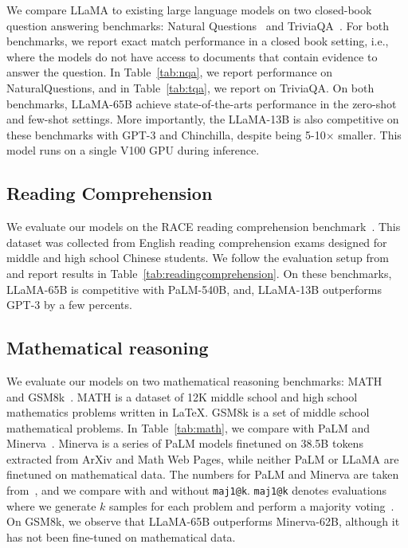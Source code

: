 We compare LLaMA to existing large language models on two closed-book question answering benchmarks: Natural Questions~\citep{kwiatkowski2019natural} and TriviaQA~\cite{joshi2017triviaqa}. For both benchmarks, we report exact match performance in a closed book setting, i.e., where the models do not have access to documents that contain evidence to answer the question. In Table~\ref{tab:nqa}, we report performance on NaturalQuestions, and in Table~\ref{tab:tqa}, we report on TriviaQA. On both benchmarks, LLaMA-65B achieve state-of-the-arts performance in the zero-shot and few-shot settings. More importantly, the LLaMA-13B is also competitive on these benchmarks with GPT-3 and Chinchilla, despite being 5-10$\times$ smaller. This model runs on a single V100 GPU during inference.

\subsection{Reading Comprehension} We evaluate our models on the RACE reading comprehension benchmark~\citep{lai2017race}. This dataset was collected from English reading comprehension exams designed for middle and high school Chinese students. We follow the evaluation setup from~\citet{brown2020gpt3}
and report results in Table~\ref{tab:readingcomprehension}.
On these benchmarks, LLaMA-65B is competitive with PaLM-540B, and, LLaMA-13B outperforms GPT-3 by a few percents.

\subsection{Mathematical reasoning}

We evaluate our models on two mathematical reasoning benchmarks: MATH~\cite{hendrycks2021measuring} and GSM8k~\cite{cobbe2021training}. MATH is a dataset of 12K middle school and high school mathematics problems written in LaTeX. GSM8k is a set of middle school mathematical problems. In Table~\ref{tab:math}, we compare with PaLM and Minerva~\cite{lewkowycz2022solving}. Minerva is a series of PaLM models finetuned on 38.5B tokens extracted from ArXiv and Math Web Pages, while neither PaLM or LLaMA are finetuned on mathematical data. The numbers for PaLM and Minerva are taken from~\citet{lewkowycz2022solving}, and we compare with and without \texttt{maj1@k}.
\texttt{maj1@k} denotes evaluations where we generate $k$ samples for each problem and perform a majority voting~\cite{wang2022Self}. On GSM8k, we observe that LLaMA-65B outperforms Minerva-62B, although it has not been fine-tuned on mathematical data.

